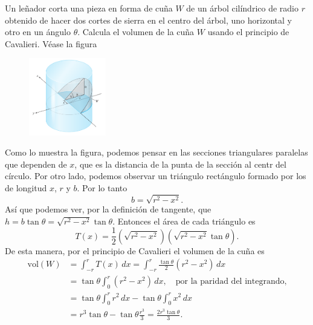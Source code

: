 Un leñador corta una pieza en forma de cuña $W$ de un árbol cilíndrico de radio $r$
obtenido de hacer dos cortes de sierra en el centro del árbol, uno horizontal
y otro en un ángulo $\theta$. Calcula el volumen de la cuña $W$ usando el 
principio de Cavalieri. 
Véase la figura
\begin{figure}[H]
    \begin{center}
        \includegraphics[width=0.3\textwidth]{img/Ej2/ej7.png}
    \end{center}
\end{figure}
\begin{solution}
    Como lo muestra la figura, podemos pensar en las secciones triangulares paralelas que dependen
    de $x$, que es la distancia de la punta de la sección al centr del círculo.
    Por otro lado, podemos observar un triángulo rectángulo formado por los de 
    longitud $x$, $r$ y $b$. Por lo tanto 
    \[
        b=\sqrt{r^2-x^2}.
    \]
    Así que podemos ver, 
    por la definición de tangente, que $h=b\tan \theta=\sqrt{r^2-x^2}\tan \theta$.
    Entonces el área de cada triángulo es 
    \[
        T(x)
        =
        \frac{1}{2} 
        \left(\sqrt{r^2-x^2}\right)
        \left( \sqrt{r^2-x^2}\tan \theta \right).
    \]
    De esta manera, por el principio de Cavalieri el volumen de la cuña es 
    \begin{align*}
        \mathrm{vol}(W)
        &=
        \int_{-r}^{r}
        T(x)
        \, dx
        =
        \int_{-r}^{r}
        \frac{\tan\theta}{2} (r^2-x^2)
        \, dx
        \\
        &=
        \tan\theta
        \int_{0}^{r}
        (r^2-x^2)
        \, dx,\quad\text{por la paridad del integrando,}\\
        &=
        \tan \theta
        \int_{0}^r
        r^2\, dx
        -\tan\theta
        \int_0^r
        x^2\, dx\\
        &=
        r^3\tan\theta-\tan\theta \frac{r^3}{3} = \frac{2 r^3 \tan \theta}{3}.
    \end{align*}
\end{solution}
